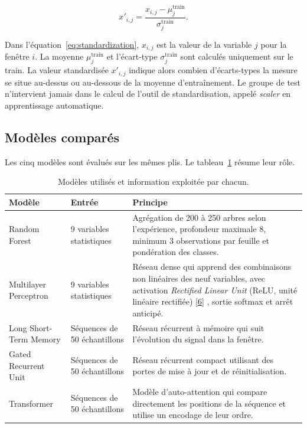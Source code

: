 \documentclass[12pt,a4paper]{article}
\newcommand{\openaccessref}[2]{%
  \nobreak\hspace{0.08em}%
  \href{#2}{\textcolor{green!35!black}{[#1]}}%
}
\begin{document}
\begin{equation}
x'_{i,j}
=
\frac{x_{i,j}-\mu^{\mathrm{train}}_j}
{\sigma^{\mathrm{train}}_j}.
\label{eq:standardization}
\end{equation}

Dans l'équation~\ref{eq:standardization}, $x_{i,j}$ est la valeur de la
variable $j$ pour la fenêtre $i$. La moyenne
$\mu^{\mathrm{train}}_j$ et l'écart-type
$\sigma^{\mathrm{train}}_j$ sont calculés uniquement sur le train. La valeur
standardisée $x'_{i,j}$ indique alors combien d'écarts-types la mesure se
situe au-dessus ou au-dessous de la moyenne d'entraînement. Le groupe de test
n'intervient jamais dans le calcul de l'outil de standardisation, appelé
\emph{scaler} en apprentissage automatique.

\subsection{Modèles comparés}

Les cinq modèles sont évalués sur les mêmes plis. Le
tableau~\ref{tab:model_config} résume leur rôle.

\begin{table}[H]
\centering
\caption{Modèles utilisés et information exploitée par chacun.}
\label{tab:model_config}
\begin{tabularx}{\linewidth}{lXX}
\toprule
\textbf{Modèle} & \textbf{Entrée} & \textbf{Principe} \\
\midrule
Random Forest
& 9 variables statistiques
& Agrégation de 200 à 250 arbres selon l'expérience, profondeur maximale 8,
minimum 3 observations par feuille et pondération des classes. \\

Multilayer Perceptron
& 9 variables statistiques
& Réseau dense qui apprend des combinaisons non linéaires des neuf variables,
avec activation \emph{Rectified Linear Unit} (ReLU, unité linéaire rectifiée)\openaccessref{6}{https://www.deeplearningbook.org}, sortie softmax et arrêt anticipé. \\

Long Short-Term Memory
& Séquences de 50 échantillons
& Réseau récurrent à mémoire qui suit l'évolution du signal dans la fenêtre. \\

Gated Recurrent Unit
& Séquences de 50 échantillons
& Réseau récurrent compact utilisant des portes de mise à jour et de
réinitialisation. \\

Transformer
& Séquences de 50 échantillons
& Modèle d'auto-attention qui compare directement les positions de la
séquence et utilise un encodage de leur ordre. \\
\bottomrule
\end{tabularx}
\end{table}
\end{document}

